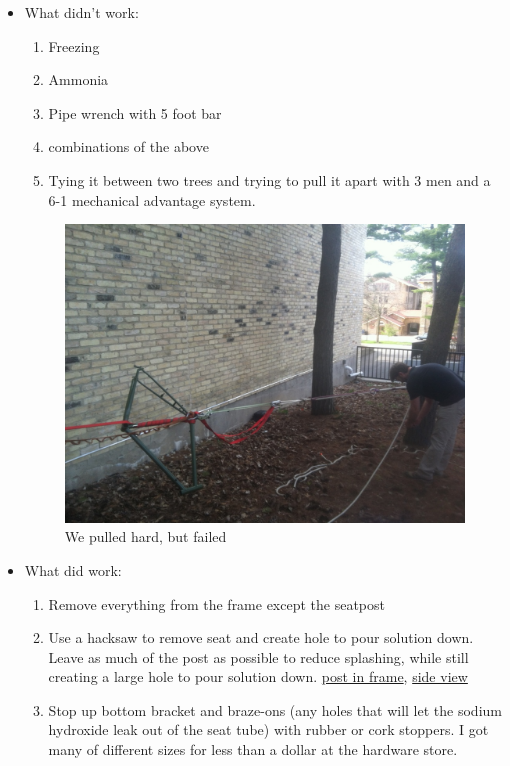 \documentclass{article}
\begin{document}
\begin{itemize}
\item What didn't work:
\label{sec:orgc182e57}
\begin{enumerate}
\item Freezing
\item Ammonia
\item Pipe wrench with 5 foot bar
\item combinations of the above
\item Tying it between two trees and trying to pull it apart with 3 men and a
6-1 mechanical advantage system.
\end{enumerate}
\begin{figure}[htbp]
\centering
\includegraphics[width=.9\linewidth]{blog_imgs/free_seatpost/pull_apart.jpg}
\caption{We pulled hard, but failed}
\end{figure}
\item What did work:
\label{sec:org367f0d2}
\begin{enumerate}
\item Remove everything from the frame except the seatpost
\item Use a hacksaw to remove seat and create hole to pour solution
down.  Leave as much of the post as possible to reduce splashing,
while still creating a large hole to pour solution
down. \href{blog\_imgs/free\_seatpost/post\_in\_frame.jpg}{post in frame}, \href{blog\_imgs/free\_seatpost/side\_post\_in\_frame.jpg}{side view}
\item Stop up bottom bracket and braze-ons (any holes that will let the
sodium hydroxide leak out of the seat tube) with rubber or cork
stoppers.  I got many of different sizes for less than a dollar at
the hardware store.

\end{enumerate}
\end{itemize}
\end{document}
